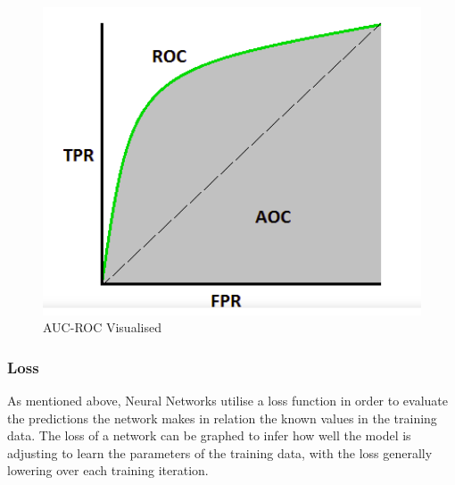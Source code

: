 \documentclass[12pt]{report}
\begin{document}
\vspace{0.5cm}
\begin{figure}[ht!]
	\centering
	\includegraphics[width=12cm]{aucroc}
	\caption{AUC-ROC Visualised}
	\label{fig:aucroc}
\end{figure}

\subsubsection{Loss}
\begin{flushleft}
As mentioned above, Neural Networks utilise a loss function in order to evaluate the predictions the network makes in relation the known values in the training data. The loss of a network can be graphed to infer how well the model is adjusting to learn the parameters of the training data, with the loss generally lowering over each training iteration.
\end{flushleft}

\newpage
\end{document}
